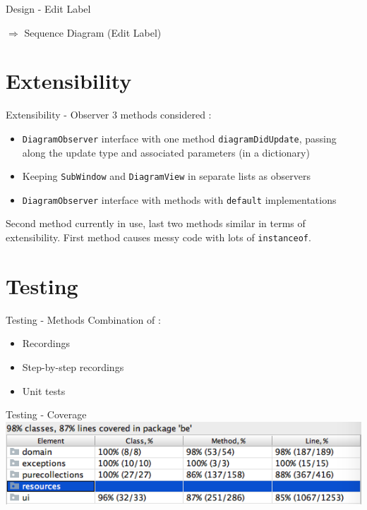 \documentclass[10pt]{beamer}
\begin{document}
\begin{frame}[fragile]{Design - Edit Label}
\begin{center}
$\Rightarrow$ Sequence Diagram (Edit Label) 
\end{center}
\end{frame}

\section{Extensibility}

\begin{frame}[fragile]{Extensibility - Observer}
3 methods considered :
\begin{itemize}
\item \texttt{DiagramObserver} interface with one method \texttt{diagramDidUpdate}, passing along the update type and associated parameters (in a dictionary)
\item Keeping \texttt{SubWindow} and \texttt{DiagramView} in separate lists as observers
\item \texttt{DiagramObserver} interface with methods with \texttt{default} implementations
\end{itemize}
Second method currently in use, last two methods similar in terms of extensibility. First method causes messy code with lots of \texttt{instanceof}.
\end{frame}

\section{Testing}

\begin{frame}[fragile]{Testing - Methods}
Combination of :
\begin{itemize}
\item Recordings
\item Step-by-step recordings
\item Unit tests
\end{itemize}
\end{frame}

\begin{frame}[fragile]{Testing - Coverage}
\includegraphics[width=1\textwidth]{coverage}
\end{frame}
\end{document}
